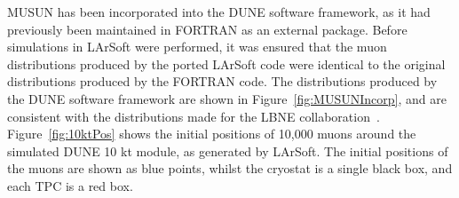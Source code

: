MUSUN has been incorporated into the DUNE software framework, as it had previously been maintained in FORTRAN as an external package. Before simulations in LArSoft were performed, it was ensured that the muon distributions produced by the ported LArSoft code were identical to the original distributions produced by the FORTRAN code. The distributions produced by the DUNE software framework are shown in Figure~\ref{fig:MUSUNIncorp}, and are consistent with the distributions made for the LBNE collaboration~\citep{MUSUNLBNE}. Figure~\ref{fig:10ktPos} shows the initial positions of 10,000 muons around the simulated DUNE 10 kt module, as generated by LArSoft. The initial positions of the muons are shown as blue points, whilst the cryostat is a single black box, and each TPC is a red box. \\


